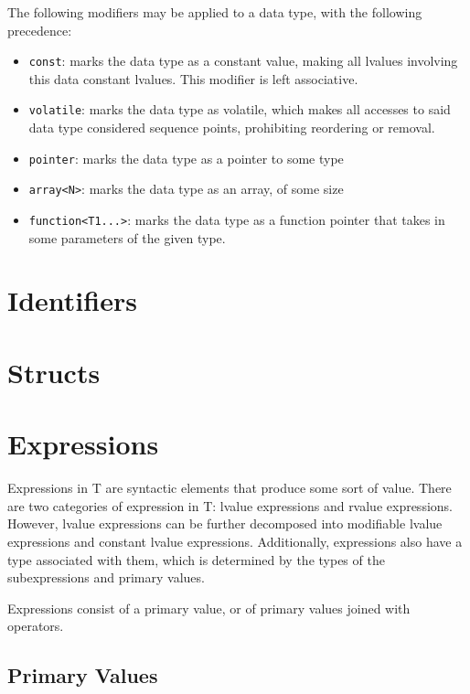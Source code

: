 \documentclass[letterpaper,12pt]{book}
\begin{document}
The following modifiers may be applied to a data type, with the following precedence:


\begin{itemize}
	\item \texttt{const}: marks the data type as a constant value, making all lvalues involving this data constant lvalues. This modifier is left associative.
	\item \texttt{volatile}: marks the data type as volatile, which makes all accesses to said data type considered sequence points, prohibiting reordering or removal.
	\item \texttt{pointer}: marks the data type as a pointer to some type
	\item \texttt{array<N>}: marks the data type as an array, of some size
	\item \texttt{function<T1...>}: marks the data type as a function pointer that takes in some parameters of the given type.
\end{itemize}

\section{Identifiers}

\section{Structs}

\section{Expressions}

Expressions in T are syntactic elements that produce some sort of value. There are two categories of expression in T: lvalue expressions and rvalue expressions. However, lvalue expressions can be further decomposed into modifiable lvalue expressions and constant lvalue expressions. Additionally, expressions also have a type associated with them, which is determined by the types of the subexpressions and primary values.

Expressions consist of a primary value, or of primary values joined with operators.

\subsection{Primary Values}
\end{document}
